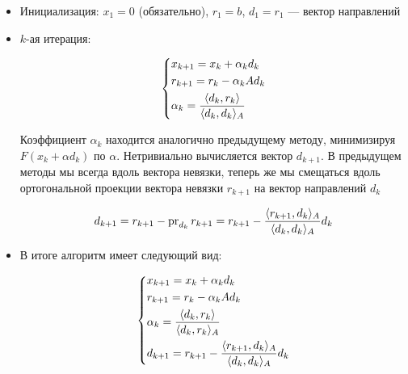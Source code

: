 \begin{itemize}
    \item Инициализация: $x_1 = 0$ (обязательно), $r_1 = b$, $d_1 = r_1$ --- вектор направлений

    \item $k$-ая итерация:

    \begin{equation*}
        \begin{dcases*}
            x_{k+1} = x_k + \alpha_k d_k\\
            r_{k+1} = r_k - \alpha_k A d_k\\
            \alpha_k = \frac{\langle d_k, r_k \rangle}{\langle d_k, d_k \rangle_A}\\
        \end{dcases*}
    \end{equation*}

    Коэффициент $\alpha_k$ находится аналогично предыдущему методу, минимизируя $F(x_k + \alpha d_k)$ по $\alpha$.  Нетривиально вычисляется вектор $d_{k+1}$. В предыдущем методы мы всегда вдоль вектора невязки, теперь же мы смещаться вдоль ортогональной проекции вектора невязки $r_{k+1}$ на вектор направлений $d_k$

    \[
    d_{k+1} = r_{k+1} - \operatorname{pr}_{d_k} r_{k+1} = r_{k+1} - \frac{\langle r_{k+1}, d_k \rangle_A}{\langle d_k, d_k \rangle_A} d_k
    \]


    \item В итоге алгоритм имеет следующий вид:

    \begin{equation*}
        \begin{dcases*}
            x_{k+1} = x_k + \alpha_k d_k\\
            r_{k+1} = r_k - \alpha_k A d_k\\
            \alpha_k = \frac{\langle d_k, r_k \rangle}{\langle d_k, r_k \rangle_A}\\
            d_{k+1} =  r_{k+1} - \frac{\langle r_{k+1}, d_k \rangle_A}{\langle d_k, d_k \rangle_A} d_k
        \end{dcases*}
    \end{equation*}
\end{itemize}

